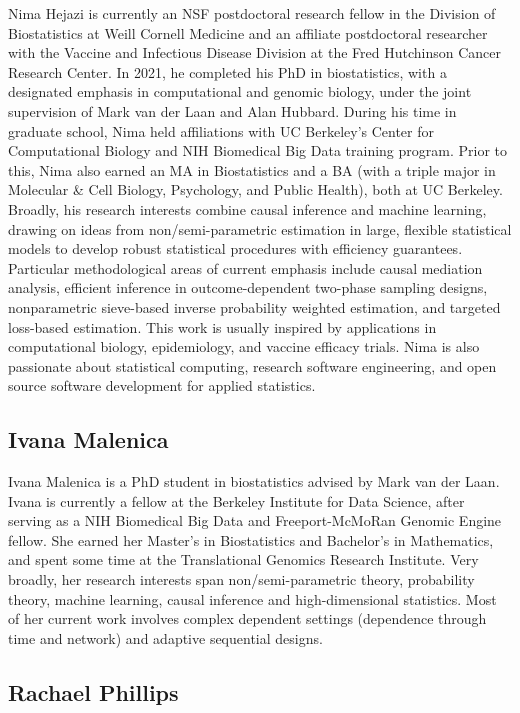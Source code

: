 \documentclass[
  12pt, krantz2,
]{krantz}
\theoremstyle{definition}
\theoremstyle{definition}
\theoremstyle{definition}
\newcommand{\1}{\mathbbm{1}}
\begin{document}
Nima Hejazi is currently an NSF postdoctoral research fellow in the Division of
Biostatistics at Weill Cornell Medicine and an affiliate postdoctoral researcher
with the Vaccine and Infectious Disease Division at the Fred Hutchinson Cancer
Research Center. In 2021, he completed his PhD in biostatistics, with a
designated emphasis in computational and genomic biology, under the joint
supervision of Mark van der Laan and Alan Hubbard. During his time in graduate
school, Nima held affiliations with UC Berkeley's Center for Computational
Biology and NIH Biomedical Big Data training program. Prior to this, Nima also
earned an MA in Biostatistics and a BA (with a triple major in Molecular \& Cell
Biology, Psychology, and Public Health), both at UC Berkeley. Broadly, his
research interests combine causal inference and machine learning, drawing on
ideas from non/semi-parametric estimation in large, flexible statistical models
to develop robust statistical procedures with efficiency guarantees. Particular
methodological areas of current emphasis include causal mediation analysis,
efficient inference in outcome-dependent two-phase sampling designs,
nonparametric sieve-based inverse probability weighted estimation, and targeted
loss-based estimation. This work is usually inspired by applications in
computational biology, epidemiology, and vaccine efficacy trials. Nima is also
passionate about statistical computing, research software engineering, and open
source software development for applied statistics.

\hypertarget{ivana-malenica}{%
\subsection*{Ivana Malenica}\label{ivana-malenica}}


Ivana Malenica is a PhD student in biostatistics advised by Mark van der Laan.
Ivana is currently a fellow at the Berkeley Institute for Data Science, after
serving as a NIH Biomedical Big Data and Freeport-McMoRan Genomic Engine fellow.
She earned her Master's in Biostatistics and Bachelor's in Mathematics, and
spent some time at the Translational Genomics Research Institute. Very broadly,
her research interests span non/semi-parametric theory, probability theory,
machine learning, causal inference and high-dimensional statistics. Most of her
current work involves complex dependent settings (dependence through time and
network) and adaptive sequential designs.

\hypertarget{rachael-phillips}{%
\subsection*{Rachael Phillips}\label{rachael-phillips}}
\end{document}

